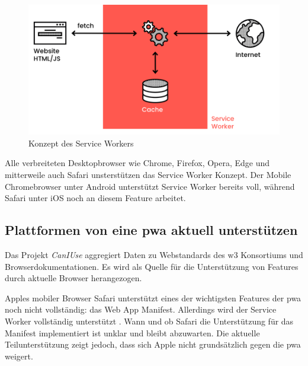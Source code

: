 \begin{figure}[h]
        \includegraphics[width=\linewidth]{img/ServiceWorker-8a0968f1b295f1ff.png}
        \centering
        \caption{Konzept des Service Workers \cite{ServiceWorkerDiagramm}}
        \label{fig:serviceWorker}
\end{figure}


Alle verbreiteten Desktopbrowser wie Chrome, Firefox, Opera, Edge und mitterweile auch Safari unsterstützen das Service Worker Konzept. Der Mobile Chromebrowser unter Android unterstützt Service Worker bereits voll, während Safari unter iOS noch an diesem Feature arbeitet. \cite[S. 9]{BeginningPWA}


\subsection{Plattformen von eine \ac{pwa} aktuell unterstützen}
Das Projekt \textit{CanIUse} aggregiert Daten zu Webstandards des w3 Konsortiums und Browserdokumentationen. Es wird als Quelle für die Unterstützung von Features durch aktuelle Browser herangezogen.

Apples mobiler Browser Safari unterstützt eines der wichtigsten Features der \ac{pwa} noch nicht vollständig: das Web App Manifest. Allerdings wird der Service Worker vollständig unterstützt \cite{CanIUseWebManifest}. Wann und ob Safari die Unterstützung für das Manifest implementiert ist unklar und bleibt abzuwarten. Die aktuelle Teilunterstützung zeigt jedoch, dass sich Apple nicht grundsätzlich gegen die \ac{pwa} weigert.





